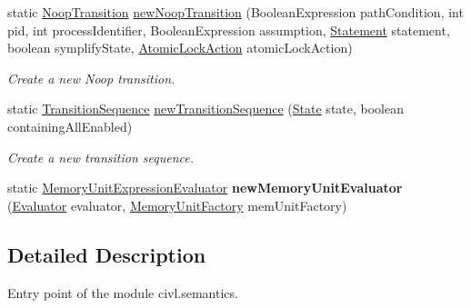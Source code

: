 \begin{DoxyCompactItemize}
\item 
static \hyperlink{interfaceedu_1_1udel_1_1cis_1_1vsl_1_1civl_1_1semantics_1_1IF_1_1NoopTransition}{Noop\+Transition} \hyperlink{classedu_1_1udel_1_1cis_1_1vsl_1_1civl_1_1semantics_1_1IF_1_1Semantics_abf331667c35ee427b9b3bf41dec850b3}{new\+Noop\+Transition} (Boolean\+Expression path\+Condition, int pid, int process\+Identifier, Boolean\+Expression assumption, \hyperlink{interfaceedu_1_1udel_1_1cis_1_1vsl_1_1civl_1_1model_1_1IF_1_1statement_1_1Statement}{Statement} statement, boolean symplify\+State, \hyperlink{enumedu_1_1udel_1_1cis_1_1vsl_1_1civl_1_1semantics_1_1IF_1_1Transition_1_1AtomicLockAction}{Atomic\+Lock\+Action} atomic\+Lock\+Action)
\begin{DoxyCompactList}\small\item\em Create a new Noop transition. \end{DoxyCompactList}\item 
static \hyperlink{interfaceedu_1_1udel_1_1cis_1_1vsl_1_1civl_1_1semantics_1_1IF_1_1TransitionSequence}{Transition\+Sequence} \hyperlink{classedu_1_1udel_1_1cis_1_1vsl_1_1civl_1_1semantics_1_1IF_1_1Semantics_a87ce2f19f6cb098dd62d0cc1daa1e18f}{new\+Transition\+Sequence} (\hyperlink{interfaceedu_1_1udel_1_1cis_1_1vsl_1_1civl_1_1state_1_1IF_1_1State}{State} state, boolean containing\+All\+Enabled)
\begin{DoxyCompactList}\small\item\em Create a new transition sequence. \end{DoxyCompactList}\item 
\hypertarget{classedu_1_1udel_1_1cis_1_1vsl_1_1civl_1_1semantics_1_1IF_1_1Semantics_af5c87ff3ebb7971541f7afac4071a484}{}static \hyperlink{interfaceedu_1_1udel_1_1cis_1_1vsl_1_1civl_1_1semantics_1_1IF_1_1MemoryUnitExpressionEvaluator}{Memory\+Unit\+Expression\+Evaluator} {\bfseries new\+Memory\+Unit\+Evaluator} (\hyperlink{interfaceedu_1_1udel_1_1cis_1_1vsl_1_1civl_1_1semantics_1_1IF_1_1Evaluator}{Evaluator} evaluator, \hyperlink{interfaceedu_1_1udel_1_1cis_1_1vsl_1_1civl_1_1state_1_1IF_1_1MemoryUnitFactory}{Memory\+Unit\+Factory} mem\+Unit\+Factory)\label{classedu_1_1udel_1_1cis_1_1vsl_1_1civl_1_1semantics_1_1IF_1_1Semantics_af5c87ff3ebb7971541f7afac4071a484}

\end{DoxyCompactItemize}


\subsection{Detailed Description}
Entry point of the module civl.\+semantics. 

